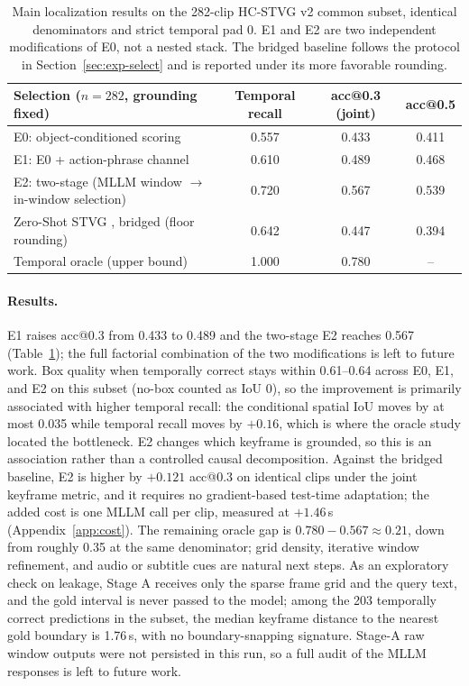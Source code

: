 \begin{table}[t]
\centering
\small
\begin{tabular}{lccc}
\toprule
Selection ($n=282$, grounding fixed) & Temporal recall & acc@0.3 (joint) & acc@0.5 \\
\midrule
E0: object-conditioned scoring & 0.557 & 0.433 & 0.411 \\
E1: E0 + action-phrase channel & 0.610 & 0.489 & 0.468 \\
E2: two-stage (MLLM window $\rightarrow$ in-window selection) & 0.720 & 0.567 & 0.539 \\
\midrule
Zero-Shot STVG \citep{zeroshotstvg2509}, bridged (floor rounding) & 0.642 & 0.447 & 0.394 \\
Temporal oracle (upper bound) & 1.000 & 0.780 & -- \\
\bottomrule
\end{tabular}
\caption{Main localization results on the 282-clip HC-STVG v2 common subset, identical denominators and strict temporal pad 0. E1 and E2 are two independent modifications of E0, not a nested stack. The bridged baseline follows the protocol in Section~\ref{sec:exp-select} and is reported under its more favorable rounding.}
\label{tab:selector}
\end{table}

\paragraph{Results.}
E1 raises acc@0.3 from 0.433 to 0.489 and the two-stage E2 reaches 0.567 (Table~\ref{tab:selector}); the full factorial combination of the two modifications is left to future work. Box quality when temporally correct stays within 0.61--0.64 across E0, E1, and E2 on this subset (no-box counted as IoU 0), so the improvement is primarily associated with higher temporal recall: the conditional spatial IoU moves by at most 0.035 while temporal recall moves by $+0.16$, which is where the oracle study located the bottleneck. E2 changes which keyframe is grounded, so this is an association rather than a controlled causal decomposition. Against the bridged baseline, E2 is higher by $+0.121$ acc@0.3 on identical clips under the joint keyframe metric, and it requires no gradient-based test-time adaptation; the added cost is one MLLM call per clip, measured at $+1.46$\,s (Appendix~\ref{app:cost}). The remaining oracle gap is $0.780-0.567\approx 0.21$, down from roughly 0.35 at the same denominator; grid density, iterative window refinement, and audio or subtitle cues are natural next steps. As an exploratory check on leakage, Stage A receives only the sparse frame grid and the query text, and the gold interval is never passed to the model; among the 203 temporally correct predictions in the subset, the median keyframe distance to the nearest gold boundary is 1.76\,s, with no boundary-snapping signature. Stage-A raw window outputs were not persisted in this run, so a full audit of the MLLM responses is left to future work.

